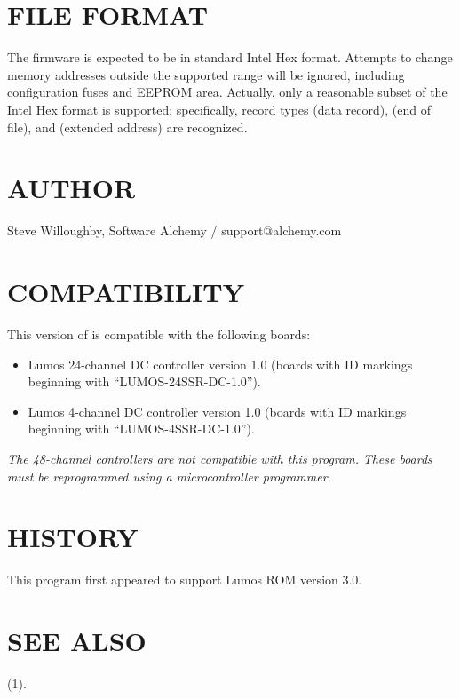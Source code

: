 \section*{FILE FORMAT}


The firmware
is expected to be in standard Intel Hex format.  Attempts to change memory
addresses outside the supported range will be ignored, including configuration
fuses and EEPROM area.  Actually, only a reasonable subset of the Intel Hex
format is supported; specifically, record types
(data record),
(end of file),
and
(extended address)
are recognized.
\section*{AUTHOR}


Steve Willoughby,
Software Alchemy / support@alchemy.com
\section*{COMPATIBILITY}


This version of 
is compatible with the following boards:
\begin{itemize}
\item
Lumos 24-channel DC controller version 1.0 (boards with ID markings beginning with
``LUMOS-24SSR-DC-1.0'').
\item
Lumos 4-channel DC controller version 1.0 (boards with ID markings beginning with
``LUMOS-4SSR-DC-1.0'').
\end{itemize}


\emph{The 48-channel controllers are not compatible with this program.}
\emph{These boards must be reprogrammed using a microcontroller programmer.}
\section*{HISTORY}


This program first appeared to support Lumos ROM version 3.0.
\section*{SEE ALSO}
(1).
